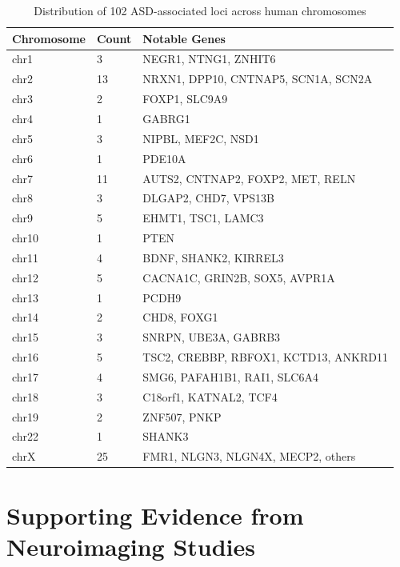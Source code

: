 \documentclass[11pt]{article}
\let\oldsection\section
\renewcommand{\section}[1]{\oldsection{#1}\setlength{\leftskip}{0em}}
\begin{document}
\begin{table}[!htbp]
\centering
\small  %
\caption{Distribution of 102 ASD-associated loci across human chromosomes}
\begin{tabular}{lll}
\toprule
\textbf{Chromosome} & \textbf{Count} & \textbf{Notable Genes} \\
\midrule
chr1 & 3 & NEGR1, NTNG1, ZNHIT6 \\
chr2 & 13 & NRXN1, DPP10, CNTNAP5, SCN1A, SCN2A \\
chr3 & 2 & FOXP1, SLC9A9 \\
chr4 & 1 & GABRG1 \\
chr5 & 3 & NIPBL, MEF2C, NSD1 \\
chr6 & 1 & PDE10A \\
chr7 & 11 & AUTS2, CNTNAP2, FOXP2, MET, RELN \\
chr8 & 3 & DLGAP2, CHD7, VPS13B \\
chr9 & 5 & EHMT1, TSC1, LAMC3 \\
chr10 & 1 & PTEN \\
chr11 & 4 & BDNF, SHANK2, KIRREL3 \\
chr12 & 5 & CACNA1C, GRIN2B, SOX5, AVPR1A \\
chr13 & 1 & PCDH9 \\
chr14 & 2 & CHD8, FOXG1 \\
chr15 & 3 & SNRPN, UBE3A, GABRB3 \\
chr16 & 5 & TSC2, CREBBP, RBFOX1, KCTD13, ANKRD11 \\
chr17 & 4 & SMG6, PAFAH1B1, RAI1, SLC6A4 \\
chr18 & 3 & C18orf1, KATNAL2, TCF4 \\
chr19 & 2 & ZNF507, PNKP \\
chr22 & 1 & SHANK3 \\
chrX & 25 & FMR1, NLGN3, NLGN4X, MECP2, others \\
\bottomrule
\end{tabular}
\end{table}

\clearpage
\section{Supporting Evidence from Neuroimaging Studies}
\end{document}
